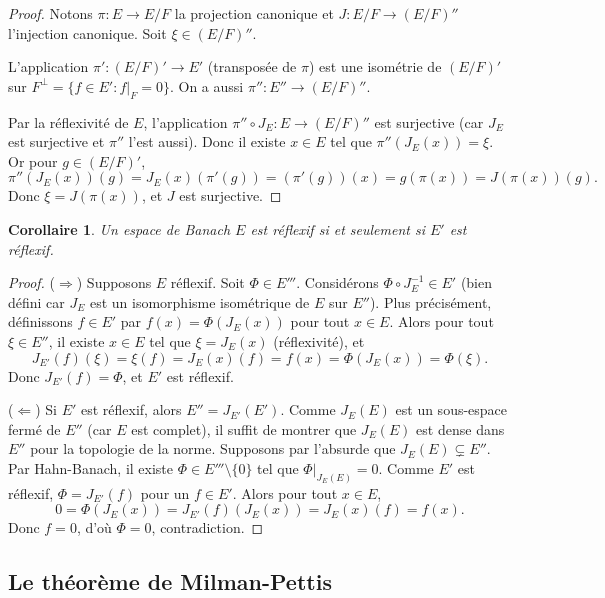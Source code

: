 \documentclass[a4paper,12pt]{book}
\theoremstyle{definition}
\theoremstyle{plain}
\newtheorem{corollaire}[definition]{Corollaire}
\theoremstyle{remark}
\begin{document}
\begin{proof}
Notons $\pi : E \to E/F$ la projection canonique et
$J : E/F \to (E/F)''$ l'injection canonique. Soit $\xi \in (E/F)''$.

L'application $\pi' : (E/F)' \to E'$ (transposée de $\pi$) est une isométrie de
$(E/F)'$ sur $F^\perp = \{ f \in E' : f|_F = 0 \}$.
On a aussi $\pi'' : E'' \to (E/F)''$.

Par la réflexivité de $E$, l'application $\pi'' \circ J_E : E \to (E/F)''$ est
surjective (car $J_E$ est surjective et $\pi''$ l'est aussi). Donc il existe
$x \in E$ tel que $\pi''(J_E(x)) = \xi$. Or pour $g \in (E/F)'$,
\[
  \pi''(J_E(x))(g) = J_E(x)(\pi'(g)) = (\pi'(g))(x) = g(\pi(x)) = J(\pi(x))(g).
\]
Donc $\xi = J(\pi(x))$, et $J$ est surjective.
\end{proof}

\begin{corollaire}
\label{cor:reflexif-dual}
Un espace de Banach $E$ est réflexif si et seulement si $E'$ est réflexif.
\end{corollaire}

\begin{proof}
($\Rightarrow$) Supposons $E$ réflexif. Soit $\Phi \in E'''$. Considérons
$\Phi \circ J_E^{-1} \in E'$ (bien défini car $J_E$ est un isomorphisme isométrique
de $E$ sur $E''$). Plus précisément, définissons $f \in E'$ par
$f(x) = \Phi(J_E(x))$ pour tout $x \in E$. Alors pour tout $\xi \in E''$,
il existe $x \in E$ tel que $\xi = J_E(x)$ (réflexivité), et
\[
  J_{E'}(f)(\xi) = \xi(f) = J_E(x)(f) = f(x) = \Phi(J_E(x)) = \Phi(\xi).
\]
Donc $J_{E'}(f) = \Phi$, et $E'$ est réflexif.

($\Leftarrow$) Si $E'$ est réflexif, alors $E'' = J_{E'}(E')$. Comme $J_E(E)$ est
un sous-espace fermé de $E''$ (car $E$ est complet), il suffit de montrer que
$J_E(E)$ est dense dans $E''$ pour la topologie de la norme. Supposons par l'absurde que
$J_E(E) \subsetneq E''$. Par Hahn-Banach, il existe $\Phi \in E''' \setminus \{0\}$
tel que $\Phi|_{J_E(E)} = 0$. Comme $E'$ est réflexif, $\Phi = J_{E'}(f)$ pour un
$f \in E'$. Alors pour tout $x \in E$,
\[
  0 = \Phi(J_E(x)) = J_{E'}(f)(J_E(x)) = J_E(x)(f) = f(x).
\]
Donc $f = 0$, d'où $\Phi = 0$, contradiction.
\end{proof}

\subsection{Le théorème de Milman-Pettis}
\label{subsec:milman-pettis}
\end{document}

